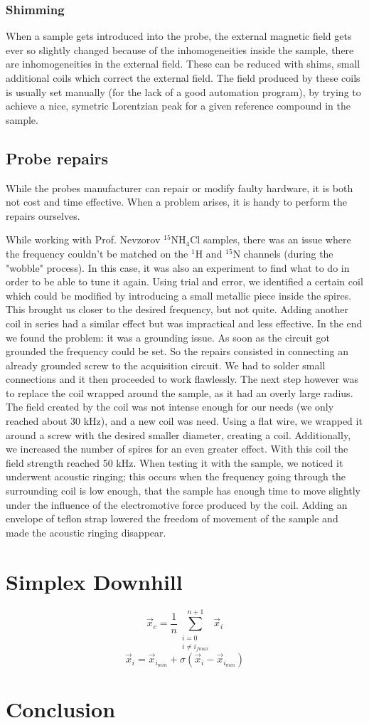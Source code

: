 \documentclass[12pt]{article}
\begin{document}
\subsubsection{Shimming}

When a sample gets introduced into the probe, the external magnetic field gets ever so slightly changed because of the inhomogeneities inside the sample, there are inhomogeneities in the external field. These can be reduced with shims, small additional coils which correct the external field. The field produced by these coils is usually set manually (for the lack of a good automation program), by trying to achieve a nice, symetric Lorentzian peak for a given reference compound in the sample. 

\subsection{Probe repairs}

While the probes manufacturer can repair or modify faulty hardware, it is both not cost and time effective. When a problem arises, it is handy to perform the repairs ourselves. 

While working with Prof. Nevzorov $^{15}$NH$_4$Cl samples, there was an issue where the frequency couldn't be matched on the $^1$H and $^{15}$N channels (during the "wobble" process). In this case, it was also an experiment to find what to do in order to be able to tune it again. Using trial and error, we identified a certain coil which could be modified by introducing a small metallic piece inside the spires. This brought us closer to the desired frequency, but not quite. Adding another coil in series had a similar effect but was impractical and less effective. In the end we found the problem: it was a grounding issue. As soon as the circuit got grounded the frequency could be set. So the repairs consisted in connecting an already grounded screw to the acquisition circuit. We had to solder small connections and it then proceeded to work flawlessly. 
The next step however was to replace the coil wrapped around the sample, as it had an overly large radius. The field created by the coil was not intense enough for our needs (we only reached about 30 kHz), and a new coil was need. Using a flat wire, we wrapped it around a screw with the desired smaller diameter, creating a coil. Additionally, we increased the number of spires for an even greater effect. With this coil the field strength reached 50 kHz. When testing it with the sample, we noticed it underwent acoustic ringing; this occurs when the frequency going through the surrounding coil is low enough, that the sample has enough time to move slightly under the influence of the electromotive force produced by the coil. Adding an envelope of teflon strap lowered the freedom of movement of the sample and made the acoustic ringing disappear.

\section{Simplex Downhill}

\[
\Vec{x}_c = \frac{1}{n} \sum_{\substack{i = 0 \\ i \neq i_{fmax}}}^{n+1} \Vec{x}_i
\]
\[
\Vec{x}_i = \Vec{x}_{i_{min}} + \sigma(\Vec{x}_i - \Vec{x}_{i_{min}})
\]
\section{Conclusion}
\end{document}
